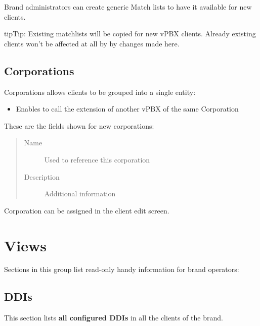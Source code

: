 \documentclass[letterpaper,10pt,english]{sphinxmanual}
\begin{document}
Brand administrators can create generic Match lists to have it available for new clients.

\begin{notice}{tip}{Tip:}
Existing matchlists will be copied for new vPBX clients. Already existing clients won't be affected at all by
by changes made here.
\end{notice}


\subsection{Corporations}
\label{administration_portal/brand/settings/corporations:corporations}\label{administration_portal/brand/settings/corporations::doc}\label{administration_portal/brand/settings/corporations:id1}
Corporations allows clients to be grouped into a single entity:
\begin{itemize}
\item {} 
Enables {\hyperref[administration_portal/client/vpbx/routing_endpoints/friends/internal_friends:internal\string-friends]{}} to call the extension of another vPBX of the same Corporation

\end{itemize}

These are the fields shown for new corporations:
\begin{quote}
\begin{description}
\item[{Name}] \leavevmode
Used to reference this corporation

\item[{Description}] \leavevmode
Additional information

\end{description}
\end{quote}

Corporation can be assigned in the client edit screen.


\section{Views}
\label{administration_portal/brand/views/index::doc}\label{administration_portal/brand/views/index:views}
Sections in this group list read-only handy information for brand operators:


\subsection{DDIs}
\label{administration_portal/brand/views/ddis:ddis}\label{administration_portal/brand/views/ddis::doc}\label{administration_portal/brand/views/ddis:id1}
This section lists \textbf{all configured DDIs} in all the clients of the brand.
\end{document}
